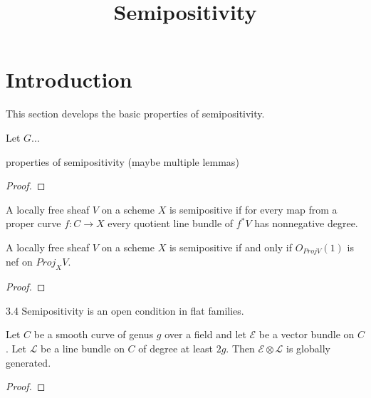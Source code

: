 


\newcommand{\todo}[1]{\footnote{\textbf{TODO.} #1}}

\title{Semipositivity}
\maketitle


\section{Introduction}
This section develops the basic properties of semipositivity.


\begin{definition}
Let $G$...
\end{definition}

\begin{lemma}
properties of semipositivity (maybe multiple lemmas)
\end{lemma}


\begin{proof}

\end{proof}


\begin{definition}
A locally free sheaf $V$ on a scheme $X$ is semipositive if for every map from a proper curve $f:C\to X$ every quotient line bundle of $f^*V$ has nonnegative degree.
\end{definition}

\begin{lemma}
A locally free sheaf $V$ on a scheme $X$ is semipositive if and only if $O_{Proj V}(1)$ is nef on $Proj_XV$.
\end{lemma}
\begin{proof}

\end{proof}

\begin{lemma}
3.4 Semipositivity is an open condition in flat families.
\end{lemma}

\begin{lemma}\label{global_generation_of_specific_twist_on_curve}
Let $C$ be a smooth curve of genus $g$ over a field and let $\mathcal{E}$ be a vector bundle on $C$. Let $\mathcal{L}$ be a line bundle on $C$ of degree at least $2g$. Then $\mathcal{E}\otimes\mathcal{L}$ is globally generated.
\end{lemma}

\begin{proof}

\end{proof}


